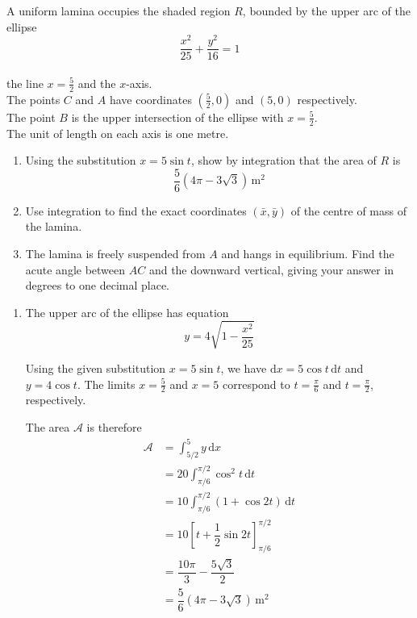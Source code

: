\documentclass[leqno]{article}
\begin{document}
\begin{enumerate}[
  label=\textbf{\arabic*.},
  leftmargin=*,
  topsep=0pt,
  partopsep=0pt,
  parsep=0pt
]
A uniform lamina occupies the shaded region $R$, bounded by the upper arc of the ellipse
\[
\dfrac{x^2}{25}+\dfrac{y^2}{16}=1
\] \\
the line $x=\frac{5}{2}$ and the $x$-axis. \\

The points $C$ and $A$ have coordinates $\left(\frac{5}{2},0\right)$ and $(5,0)$ respectively. \\
The point $B$ is the upper intersection of the ellipse with $x=\frac{5}{2}$. \\
The unit of length on each axis is one metre. \\
\begin{enumerate}[label=\textbf{(\alph*)}]
\item Using the substitution $x=5\sin t$, show by integration that the area of $R$ is
\[
\dfrac{5}{6}\left(4\pi-3\sqrt{3}\right)\,\mathrm{m}^2
\] 
\item Use integration to find the exact coordinates $(\bar{x},\bar{y})$ of the centre of mass of the lamina.  \\
\item The lamina is freely suspended from $A$ and hangs in equilibrium. Find the acute angle between $AC$ and the downward vertical, giving your answer in degrees to one decimal place.  \\
\end{enumerate}

\vspace*{10pt}

\begin{djsSolution}
\begin{enumerate}[label=\textbf{(\alph*)}, start=1]
\item The upper arc of the ellipse has equation
\[
y=4\sqrt{1-\dfrac{x^2}{25}}
\]

Using the given substitution \(x=5\sin t\), we have \(\mathrm{d}x=5\cos t\,\mathrm{d}t\) and \(y=4\cos t\). The limits \(x=\frac{5}{2}\) and \(x=5\) correspond to \(t=\frac{\pi}{6}\) and \(t=\frac{\pi}{2}\), respectively.

The area \(\mathcal{A}\) is therefore
\begin{align*}
\mathcal{A}&=\int_{5/2}^{5}y\,\mathrm{d}x\\
&=20\int_{\pi/6}^{\pi/2}\cos^2t\,\mathrm{d}t\\
&=10\int_{\pi/6}^{\pi/2}(1+\cos 2t)\,\mathrm{d}t\\
&=10\left[t+\dfrac{1}{2}\sin 2t\right]_{\pi/6}^{\pi/2}\\
&=\dfrac{10\pi}{3}-\dfrac{5\sqrt{3}}{2}\\
&=\dfrac{5}{6}\left(4\pi-3\sqrt{3}\right)\,\mathrm{m}^2
\end{align*}


\end{enumerate}
\end{djsSolution}
\end{enumerate}
\end{document}
